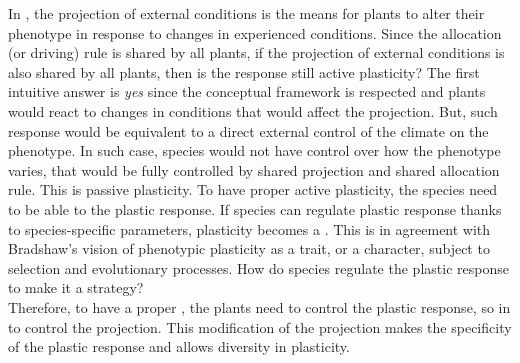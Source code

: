 In \model, the projection of external conditions is the means for plants to alter their phenotype in response to changes in experienced conditions. Since the allocation (or driving) rule is shared by all plants, if the projection of external conditions is also shared by all plants, then is the response still active plasticity? The first intuitive answer is \textit{yes} since the conceptual framework is respected and plants would react to changes in conditions that would affect the projection. But, such response would be equivalent to a direct external control of the climate on the phenotype. In such case, species would not have control over how the phenotype varies, that would be fully controlled by shared projection and shared allocation rule. This is passive plasticity. To have proper active plasticity, the species need to be able to  the plastic response. If species can regulate plastic response thanks to species-specific parameters, plasticity becomes a . This is in agreement with Bradshaw's vision of phenotypic plasticity as a trait, or a character, subject to selection and evolutionary processes\parencite{bradshaw_evolutionary_1965, bradshaw_unravelling_2006}. How do species regulate the plastic response to make it a strategy?\\

Therefore, to have a proper , the plants need to control the plastic response, so in \model to control the projection. This modification of the projection makes the specificity of the plastic response and allows diversity in plasticity. 



